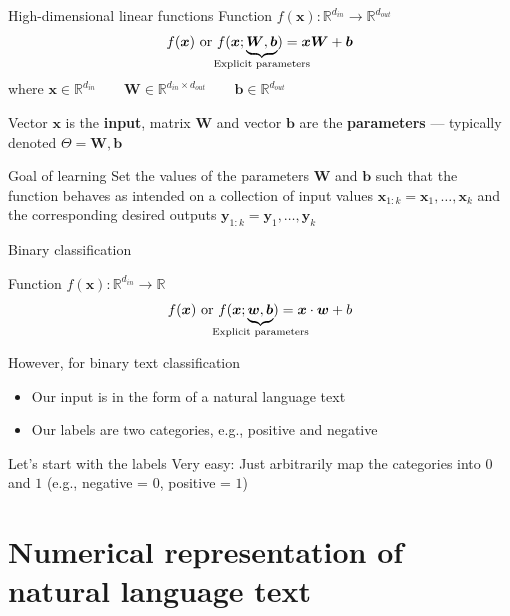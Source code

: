 \documentclass[12pt,aspectratio=169,handout]{beamer}
\begin{document}
\begin{frame}{High-dimensional linear functions}
Function $f(\bm{x}) : \mathbb{R}^{d_{in}} \to \mathbb{R}^{d_{out}}$
$$f(\bm{x}) \text{ or }
f(\bm{x}; \underbrace{\bm{W}, \bm{b}}_{\mathclap{\text{Explicit parameters}}})
= \bm{x} \bm{W} + \bm{b}$$
where
$\bm{x} \in \mathbb{R}^{d_{in}} \qquad
\bm{W} \in \mathbb{R}^{d_{in} \times d_{out}} \qquad
\bm{b} \in \mathbb{R}^{d_{out}}$

Vector $\bm{x}$ is the \textbf{input}, matrix $\bm{W}$ and vector $\bm{b}$ are the \textbf{parameters} --- typically denoted $\Theta = \bm{W}, \bm{b}$

\begin{block}{Goal of learning}
Set the values of the parameters $\bm{W}$ and $\bm{b}$ such that
the function behaves as intended on a collection of input values
$\bm{x}_{1:k} = \bm{x}_1, \ldots, \bm{x}_k$ 
and the corresponding desired outputs
$\bm{y}_{1:k} = \bm{y}_1, \ldots, \bm{y}_k$
\end{block}

\end{frame}




\begin{frame}{Binary classification}

Function $f(\bm{x}) : \mathbb{R}^{d_{in}} \to \mathbb{R}$
$$f(\bm{x}) \text{ or }
f(\bm{x}; \underbrace{\bm{w}, \bm{b}}_{\mathclap{\text{Explicit parameters}}})
= \bm{x} \cdot \bm{w} + b$$

However, for binary text classification
\begin{itemize}
	\item Our input is in the form of a natural language text
	\item Our labels are two categories, e.g., positive and negative
\end{itemize}

\begin{block}{Let's start with the labels}
Very easy: Just arbitrarily map the categories into $0$ and $1$ (e.g., negative = $0$, positive = $1$)
\end{block}

\end{frame}



\section{Numerical representation of natural language text}
\end{document}
